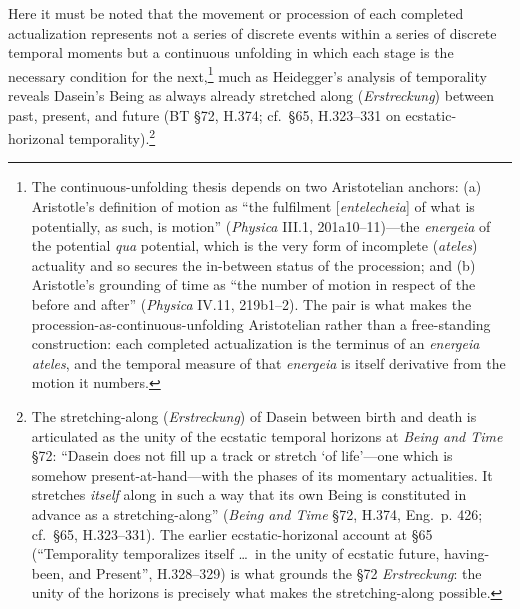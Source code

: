\documentclass{article}
\begin{document}
Here it must be noted that the movement or procession of each completed actualization represents not a series of discrete events within a series of discrete temporal moments but a continuous unfolding in which each stage is the necessary condition for the next,\footnote{The continuous-unfolding thesis depends on two Aristotelian anchors: (a) Aristotle's definition of motion as ``the fulfilment [\textit{entelecheia}] of what is potentially, as such, is motion'' (\textit{Physica} III.1, 201a10--11)---the \textit{energeia} of the potential \textit{qua} potential, which is the very form of incomplete (\textit{ateles}) actuality and so secures the in-between status of the procession; and (b) Aristotle's grounding of time as ``the number of motion in respect of the before and after'' (\textit{Physica} IV.11, 219b1--2). The pair is what makes the procession-as-continuous-unfolding Aristotelian rather than a free-standing construction: each completed actualization is the terminus of an \textit{energeia ateles}, and the temporal measure of that \textit{energeia} is itself derivative from the motion it numbers.} much as Heidegger's analysis of temporality reveals Dasein's Being as always already stretched along (\textit{Erstreckung}) between past, present, and future (BT §72, H.374; cf.~§65, H.323--331 on ecstatic-horizonal temporality).\footnote{The stretching-along (\textit{Erstreckung}) of Dasein between birth and death is articulated as the unity of the ecstatic temporal horizons at \textit{Being and Time} §72: ``Dasein does not fill up a track or stretch `of life'---one which is somehow present-at-hand---with the phases of its momentary actualities. It stretches \textit{itself} along in such a way that its own Being is constituted in advance as a stretching-along'' (\textit{Being and Time} §72, H.374, Eng.~p. 426; cf.~§65, H.323--331). The earlier ecstatic-horizonal account at §65 (``Temporality temporalizes itself \ldots\ in the unity of ecstatic future, having-been, and Present'', H.328--329) is what grounds the §72 \textit{Erstreckung}: the unity of the horizons is precisely what makes the stretching-along possible.}
\end{document}
